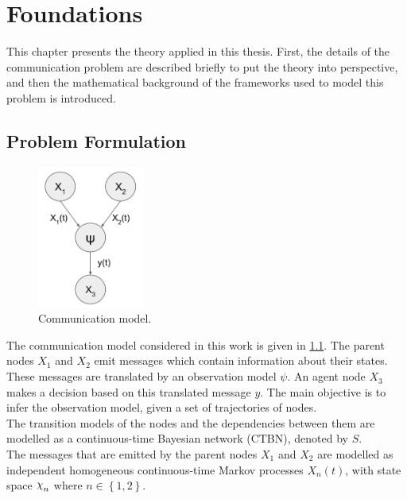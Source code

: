 \chapter{Foundations}
\label{chap:2}

This chapter presents the theory applied in this thesis. First, the details of the communication problem are described briefly to put the theory into perspective, and then the mathematical background of the frameworks used to model this problem is introduced. 

\section{Problem Formulation}
\label{sec:prob_formulation}

\begin{figure}
	\begin{center}
		\includegraphics[width=3.5cm]{figures/simple_graph}
		\caption{Communication model.}
		\label{fig:graph_model}
	\end{center}
\end{figure} 
The communication model considered in this work is given in \cref{fig:graph_model}. The parent nodes $X_{1}$ and $ X_{2}$ emit messages which contain information about their states. These messages are translated by an observation model $\psi$. An agent node $ X_{3} $ makes a decision based on this translated message $ y $. The main objective is to infer the observation model, given a set of trajectories of nodes.\\
The transition models of the nodes and the dependencies between them are modelled as a continuous-time Bayesian network (CTBN), denoted by $ S $. \\%
The messages that are emitted by the parent nodes $X_{1}$ and $ X_{2} $ are modelled as independent homogeneous continuous-time Markov processes $X_{n}(t)$, with state space $ \rchi_{n} $ where $ n \in \left\lbrace 1,2 \right\rbrace $.\\
